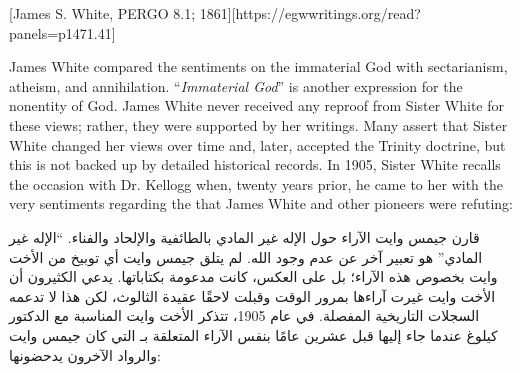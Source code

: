 [James S. White, PERGO 8.1; 1861][https://egwwritings.org/read?panels=p1471.41]


James White compared the sentiments on the immaterial God with sectarianism, atheism, and annihilation. “\textit{Immaterial God}” is another expression for the nonentity of God. James White never received any reproof from Sister White for these views; rather, they were supported by her writings. Many assert that Sister White changed her views over time and, later, accepted the Trinity doctrine, but this is not backed up by detailed historical records. In 1905, Sister White recalls the occasion with Dr. Kellogg when, twenty years prior, he came to her with the very sentiments regarding the  that James White and other pioneers were refuting:


قارن جيمس وايت الآراء حول الإله غير المادي بالطائفية والإلحاد والفناء. “الإله غير المادي” هو تعبير آخر عن عدم وجود الله. لم يتلق جيمس وايت أي توبيخ من الأخت وايت بخصوص هذه الآراء؛ بل على العكس، كانت مدعومة بكتاباتها. يدعي الكثيرون أن الأخت وايت غيرت آراءها بمرور الوقت وقبلت لاحقًا عقيدة الثالوث، لكن هذا لا تدعمه السجلات التاريخية المفصلة. في عام 1905، تتذكر الأخت وايت المناسبة مع الدكتور كيلوغ عندما جاء إليها قبل عشرين عامًا بنفس الآراء المتعلقة بـ التي كان جيمس وايت والرواد الآخرون يدحضونها:


